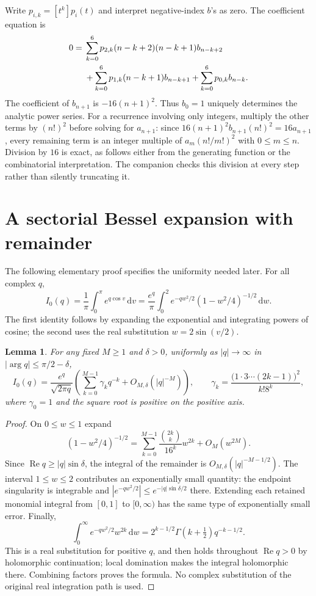 \documentclass[11pt,letterpaper]{article}
\numberwithin{equation}{section}
\newtheorem{lemma}[theorem]{Lemma}
\theoremstyle{remark}\newtheorem{remark}[theorem]{Remark}
\newcommand{\dd}{\,\mathrm d}
\newcommand{\Rea}{\operatorname{Re}}
\begin{document}
Write $p_{i,k}=[t^k]p_i(t)$ and interpret negative-index $b$'s as zero.
The coefficient equation is
\begin{align}\label{sbm:eq:recurrence}
0={}&\sum_{k=0}^6p_{2,k}(n-k+2)(n-k+1)b_{n-k+2}\notag\\
 &+\sum_{k=0}^6p_{1,k}(n-k+1)b_{n-k+1}
   +\sum_{k=0}^6p_{0,k}b_{n-k}.
\end{align}
The coefficient of $b_{n+1}$ is $-16(n+1)^2$. Thus $b_0=1$ uniquely
determines the analytic power series. For a recurrence involving only
integers, multiply the other terms by $(n!)^2$ before solving for
$a_{n+1}$: since
$16(n+1)^2b_{n+1}(n!)^2=16a_{n+1}$, every remaining term is an integer
multiple of $a_m(n!/m!)^2$ with $0\leq m\leq n$. Division by $16$ is
exact, as follows either from the generating function or the
combinatorial interpretation. The companion checks this division at
every step rather than silently truncating it.

\section{A sectorial Bessel expansion with remainder}\label{sbm:sec:bessel}
The following elementary proof specifies the uniformity needed later.
For all complex $q$,
\begin{equation}\label{sbm:eq:bessel-integral}
 I_0(q)=\frac1\pi\int_0^\pi e^{q\cos v}\dd v
       =\frac{e^q}\pi\int_0^2
          e^{-qw^2/2}(1-w^2/4)^{-1/2}\dd w.
\end{equation}
The first identity follows by expanding the exponential and
integrating powers of cosine; the second uses the real substitution
$w=2\sin(v/2)$.

\begin{lemma}\label{sbm:lem:bessel}
For any fixed $M\geq1$ and $\delta>0$, uniformly as $|q|\to\infty$ in
$|\arg q|\leq\pi/2-\delta$,
\begin{equation}\label{sbm:eq:bessel-asym}
 I_0(q)=\frac{e^q}{\sqrt{2\pi q}}
  \left(\sum_{k=0}^{M-1}\gamma_kq^{-k}+O_{M,\delta}(|q|^{-M})\right),
 \qquad
 \gamma_k=\frac{\bigl(1\cdot3\cdots(2k-1)\bigr)^2}{k!8^k},
\end{equation}
where $\gamma_0=1$ and the square root is positive on the positive axis.
\end{lemma}
\begin{proof}
On $0\leq w\leq1$ expand
\[
 (1-w^2/4)^{-1/2}
   =\sum_{k=0}^{M-1}\frac{\binom{2k}{k}}{16^k}w^{2k}
       +O_M(w^{2M}).
\]
Since $\Rea q\geq |q|\sin\delta$, the integral of the remainder is
$O_{M,\delta}(|q|^{-M-1/2})$. The interval $1\leq w\leq2$ contributes
an exponentially small quantity: the endpoint singularity is
integrable and $|e^{-qw^2/2}|\leq e^{-|q|\sin\delta/2}$ there.
Extending each retained monomial integral from $[0,1]$ to
$[0,\infty)$ has the same type of exponentially small error. Finally,
\[
 \int_0^\infty e^{-qw^2/2}w^{2k}\dd w
   =2^{k-1/2}\Gamma(k+\tfrac12)q^{-k-1/2}.
\]
This is a real substitution for positive $q$, and then holds throughout
$\Rea q>0$ by holomorphic continuation; local domination makes the
integral holomorphic there. Combining factors proves the formula.
No complex substitution of the original real integration path is used.
\end{proof}
\end{document}
